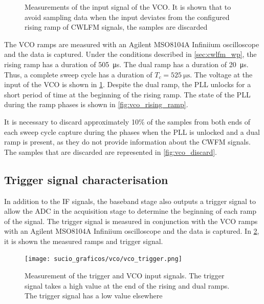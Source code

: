 \begin{figure}[htb]
	\centering
	\caption{Measurements of the input signal of the VCO. It is shown that to avoid sampling data when the input deviates from the configured rising ramp of CWLFM signals, the samples are discarded \label{fig:vco}}
\end{figure}

The VCO ramps are measured with an Agilent MSO8104A Infiniium oscilloscope and the data is captured. Under the conditions described in \cref{sec:cwlfm_wp}, the rising ramp has a duration of \SI{505}{\micro\second}. The dual ramp has a duration of \SI{20}{\micro\second}. Thus, a complete sweep cycle has a duration of $T_c = \SI{525}{\micro\second}$. The voltage at the input of the VCO is shown in \cref{fig:vco}. Despite the dual ramp, the PLL unlocks for a short period of time at the beginning of the rising ramp. The state of the PLL during the ramp phases is shown in \cref{fig:vco_rising_ramp}.

It is necessary to discard approximately 10\% of the samples from both ends of each sweep cycle capture during the phases when the PLL is unlocked and a dual ramp is present, as they do not provide information about the CWFM signals. The samples that are discarded are represented in \cref{fig:vco_discard}.

\subsection{Trigger signal characterisation} \label{sec:trigger_signal_characterisation}

In addition to the IF signals, the baseband stage also outputs a trigger signal to allow the ADC in the acquisition stage to determine the beginning of each ramp of the signal. The trigger signal is measured in conjunction with the VCO ramps with an Agilent MSO8104A Infiniium oscilloscope and the data is captured. In \cref{fig:trigger}, it is shown the measured ramps and trigger signal.

\begin{figure}[h]
	\centering
	\texttt{[image: sucio\_graficos/vco/vco\_trigger.png]} %
	\caption{Measurement of the trigger and VCO input signals. The trigger signal takes a high value at the end of the rising and dual ramps. The trigger signal has a low value elsewhere}
	\label{fig:trigger}
\end{figure}

